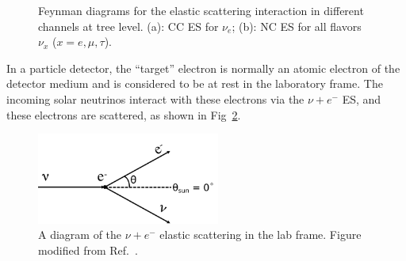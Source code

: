 \begin{figure}[htbp]
	\centering
	\caption[Feynman diagrams for the elastic scattering interaction at tree level.]{Feynman diagrams for the elastic scattering interaction in different channels at tree level. (a): CC ES for $\nu_e$; (b): NC ES for all flavors $\nu_x$ ($x=e,\mu,\tau$).\label{fig:feynman-es}}
\end{figure}


In a particle detector, the ``target'' electron is normally an atomic electron of the detector medium and is considered to be at rest in the laboratory frame. The incoming solar neutrinos interact with these electrons via the $\nu+e^-$ ES, and these electrons are scattered, as shown in Fig~\ref{fig:ESdiagram}. 

\begin{figure}[htbp]
	\centering	
	\includegraphics[width=6cm]{ElasticScatteringCartoon.png}
	\caption[A diagram of the $\nu + e^-$ elastic scattering in the lab frame.]{A diagram of the $\nu + e^-$ elastic scattering in the lab frame. Figure modified from Ref.~\cite{giunti2007fundamentals}.	\label{fig:ESdiagram}}
\end{figure}

